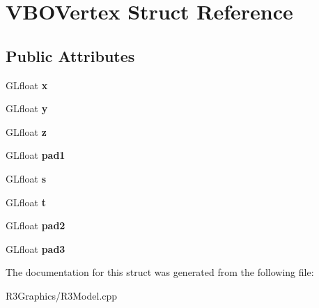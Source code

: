 \hypertarget{struct_v_b_o_vertex}{}\section{V\+B\+O\+Vertex Struct Reference}
\label{struct_v_b_o_vertex}
\subsection*{Public Attributes}
\begin{DoxyCompactItemize}
\item 
G\+Lfloat {\bfseries x}\hypertarget{struct_v_b_o_vertex_abeb44040bb428bf2a059a04f47f5ed4a}{}\label{struct_v_b_o_vertex_abeb44040bb428bf2a059a04f47f5ed4a}

\item 
G\+Lfloat {\bfseries y}\hypertarget{struct_v_b_o_vertex_a1976adeab1e0374f67a9bc644e91951f}{}\label{struct_v_b_o_vertex_a1976adeab1e0374f67a9bc644e91951f}

\item 
G\+Lfloat {\bfseries z}\hypertarget{struct_v_b_o_vertex_ae61e338e60415365cdcf27e7803d5a1d}{}\label{struct_v_b_o_vertex_ae61e338e60415365cdcf27e7803d5a1d}

\item 
G\+Lfloat {\bfseries pad1}\hypertarget{struct_v_b_o_vertex_a1aab4aa7cb25302f14e5e73d17136c5b}{}\label{struct_v_b_o_vertex_a1aab4aa7cb25302f14e5e73d17136c5b}

\item 
G\+Lfloat {\bfseries s}\hypertarget{struct_v_b_o_vertex_a620cba7df577bd1aca1f1f6dec756316}{}\label{struct_v_b_o_vertex_a620cba7df577bd1aca1f1f6dec756316}

\item 
G\+Lfloat {\bfseries t}\hypertarget{struct_v_b_o_vertex_a3e4546537393fb3ccb4b70cff40bcd86}{}\label{struct_v_b_o_vertex_a3e4546537393fb3ccb4b70cff40bcd86}

\item 
G\+Lfloat {\bfseries pad2}\hypertarget{struct_v_b_o_vertex_ae2c187af3ee70cff57b23bff286f7767}{}\label{struct_v_b_o_vertex_ae2c187af3ee70cff57b23bff286f7767}

\item 
G\+Lfloat {\bfseries pad3}\hypertarget{struct_v_b_o_vertex_afb871fdd8773d66614cfce8212af21a2}{}\label{struct_v_b_o_vertex_afb871fdd8773d66614cfce8212af21a2}

\end{DoxyCompactItemize}


The documentation for this struct was generated from the following file\+:\begin{DoxyCompactItemize}
\item 
R3\+Graphics/R3\+Model.\+cpp\end{DoxyCompactItemize}

